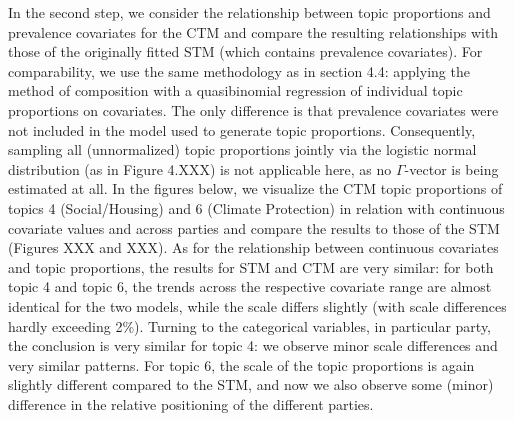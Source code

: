 In the second step, we consider the relationship between topic proportions and prevalence covariates for the CTM and compare the resulting relationships with those of the originally fitted STM (which contains prevalence covariates). For comparability, we use the same methodology as in section 4.4: applying the method of composition with a quasibinomial regression of individual topic proportions on covariates. The only difference is that prevalence covariates were not included in the model used to generate topic proportions. Consequently, sampling all (unnormalized) topic proportions jointly via the logistic normal distribution (as in Figure 4.XXX) is not applicable here, as no $\Gamma$-vector is being estimated at all. In the figures below, we visualize the CTM topic proportions of topics 4 (Social/Housing) and 6 (Climate Protection) in relation with continuous covariate values and across parties and compare the results to those of the STM (Figures XXX and XXX). As for the relationship between continuous covariates and topic proportions, the results for STM and CTM are very similar: for both topic 4 and topic 6, the trends across the respective covariate range are almost identical for the two models, while the scale differs slightly (with scale differences hardly exceeding 2\%). Turning to the categorical variables, in particular party, the conclusion is very similar for topic 4: we observe minor scale differences and very similar patterns. For topic 6, the scale of the topic proportions is again slightly different compared to the STM, and now we also observe some (minor) difference in the relative positioning of the different parties. 

